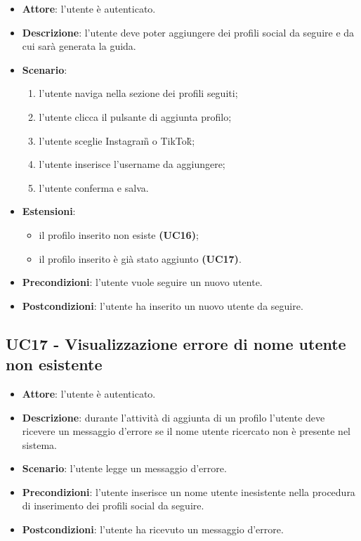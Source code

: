 \begin{itemize}
    \item \textbf{Attore}: l'utente è autenticato.
    \item \textbf{Descrizione}: l'utente deve poter aggiungere dei profili social da seguire e da cui sarà generata la guida.
    \item \textbf{Scenario}:
    \begin{enumerate}
        \item l'utente naviga nella sezione dei profili seguiti;
        \item l'utente clicca il pulsante di aggiunta profilo;
        \item l'utente sceglie Instagram\G{} o TikTok\G{};
        \item l'utente inserisce l'username da aggiungere;
        \item l'utente conferma e salva.
    \end{enumerate}
    \item \textbf{Estensioni}:
    \begin{itemize}
    	\item il profilo inserito non esiste \textbf{(UC16)};
    	\item il profilo inserito è già stato aggiunto \textbf{(UC17)}.
    \end{itemize} 
    \item \textbf{Precondizioni}: l'utente vuole seguire un nuovo utente.
    \item \textbf{Postcondizioni}: l'utente ha inserito un nuovo utente da seguire.
\end{itemize}

\subsection{UC17 - Visualizzazione errore di nome utente non esistente}
\begin{itemize}
    \item \textbf{Attore}: l'utente è autenticato.
    \item \textbf{Descrizione}: durante l'attività di aggiunta di un profilo l'utente deve ricevere un messaggio d'errore se il nome utente ricercato non è presente nel sistema.
    \item \textbf{Scenario}: l'utente legge un messaggio d'errore. 
    \item \textbf{Precondizioni}: l'utente inserisce un nome utente inesistente nella procedura di inserimento dei profili social da seguire.
    \item \textbf{Postcondizioni}: l'utente ha ricevuto un messaggio d'errore.
\end{itemize}

